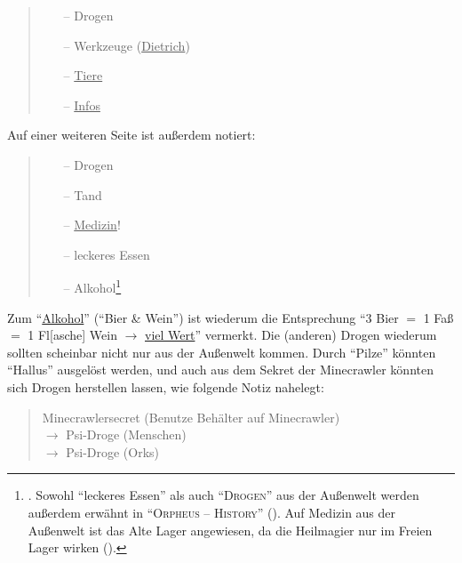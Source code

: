 \documentclass[a5paper,pagesize,numbers=noenddot]{scrbook}
\begin{document}
\begin{quote}
   \begin{itemize}
      \item[--] Drogen
      \item[--] Werkzeuge (\uline{Dietrich})
      \item[--] \uline{Tiere}
      \item[--] \uline{Infos}\autocite[S.~6]{orpheus_b_scribbles}
   \end{itemize}
\end{quote}

\noindent Auf einer weiteren Seite ist außerdem notiert:

\begin{quote}
   \begin{itemize}
      \item[--] Drogen
      \item[--] Tand
      \item[--] \uline{Medizin}!
      \item[--] leckeres Essen
      \item[--] Alkohol\footnote{\autocite[S.~13]{orpheus_b_scribbles}. Sowohl \enquote{leckeres Essen} als auch \enquote{\textsc{Drogen}} aus der Außenwelt werden außerdem erwähnt in \enquote{\textsc{Orpheus -- History}} (\autocite[S.~2]{orpheus_b_scribbles}).
      Auf Medizin aus der Außenwelt ist das Alte Lager angewiesen, da die Heilmagier nur im Freien Lager wirken (\autocite[vgl.][S.~7]{orpheus_gildensystem}).}
   \end{itemize}
\end{quote}

\noindent Zum \enquote{\uline{Alkohol}} (\enquote{Bier \& Wein}) ist wiederum die Entsprechung \enquote{3 Bier $=$ 1 Faß $=$ 1 Fl[asche] Wein $\rightarrow$ \uline{viel Wert}} vermerkt.\autocite[S.~6]{orpheus_b_scribbles}
Die (anderen) Drogen wiederum sollten scheinbar nicht nur aus der Außenwelt kommen.
Durch \enquote{Pilze} könnten \enquote{Hallus} ausgelöst werden, und auch aus dem Sekret der Minecrawler könnten sich Drogen herstellen lassen, wie folgende Notiz nahelegt:

\begin{quote}
   Minecrawlersecret (Benutze Behälter auf Minecrawler)\\
   $\rightarrow$ Psi-Droge (Menschen)\\
   $\rightarrow$ Psi-Droge (Orks)\autocite[S.~6]{orpheus_b_scribbles}
\end{quote}


\end{document}
